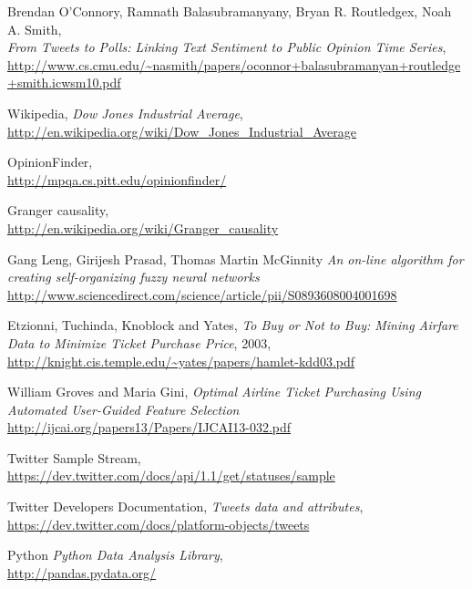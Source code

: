 \documentclass[minf,frontabs,twoside,singlespacing,parskip]{infthesis}
\begin{document}
\begin{thebibliography}{10}
	Brendan O'Connory,  Ramnath Balasubramanyany, Bryan R. Routledgex, Noah A. Smith, \\  
	\emph{From Tweets to Polls: Linking Text Sentiment to Public Opinion Time Series}, \\
	{\url{http://www.cs.cmu.edu/~nasmith/papers/oconnor+balasubramanyan+routledge+smith.icwsm10.pdf}}

	Wikipedia, \emph{Dow Jones Industrial Average}, \\
	{\url{http://en.wikipedia.org/wiki/Dow_Jones_Industrial_Average}}

	OpinionFinder, \\
	{\url{http://mpqa.cs.pitt.edu/opinionfinder/}}
	
	Granger causality, \\
	{\url{http://en.wikipedia.org/wiki/Granger_causality}}

	Gang Leng, Girijesh Prasad, Thomas Martin McGinnity
	\emph{An on-line algorithm for creating self-organizing fuzzy neural networks} \\
	{\url{http://www.sciencedirect.com/science/article/pii/S0893608004001698}}
  
 	Etzionni, Tuchinda, Knoblock and Yates, \emph{To Buy or Not to Buy: Mining Airfare Data to Minimize Ticket Purchase Price}, 2003, \\
  	{\url{http://knight.cis.temple.edu/~yates/papers/hamlet-kdd03.pdf}}
	
	William Groves and Maria Gini, \emph{Optimal Airline Ticket Purchasing Using Automated User-Guided Feature Selection} \\
	{\url{http://ijcai.org/papers13/Papers/IJCAI13-032.pdf}}

	Twitter Sample Stream, \\
	{\url{https://dev.twitter.com/docs/api/1.1/get/statuses/sample}}
	
	Twitter Developers Documentation, \emph{Tweets data and attributes},\\
	{\url{https://dev.twitter.com/docs/platform-objects/tweets}}

	Python  \emph{Python Data Analysis Library},\\
	{\url{http://pandas.pydata.org/}}


\end{thebibliography}
\end{document}
